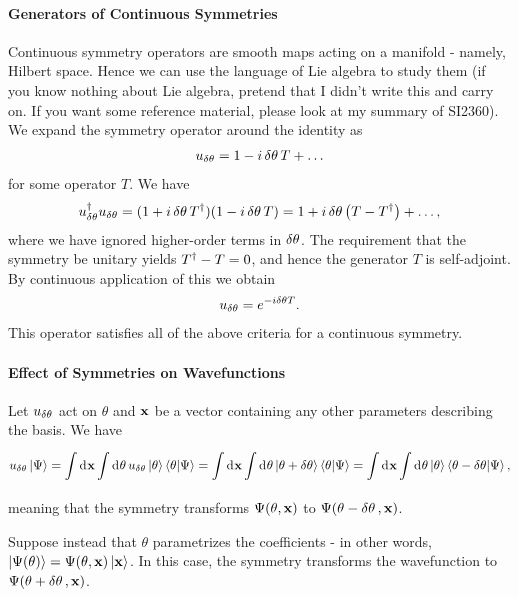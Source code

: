 \paragraph{Generators of Continuous Symmetries}
Continuous symmetry operators are smooth maps acting on a manifold - namely, Hilbert space. Hence we can use the language of Lie algebra to study them (if you know nothing about Lie algebra, pretend that I didn't write this and carry on. If you want some reference material, please look at my summary of SI2360). We expand the symmetry operator around the identity as
\begin{align*}
	u_{\var{\theta}} = 1 - i\var{\theta}T + \dots
\end{align*}
for some operator $T$. We have
\begin{align*}
	u_{\var{\theta}}^{\dagger}u_{\var{\theta}} = (1 + i\var{\theta}T^{\dagger})(1 - i\var{\theta}T) = 1 + i\var{\theta}\left(T - T^{\dagger}\right) + \dots,
\end{align*}
where we have ignored higher-order terms in $\var{\theta}$. The requirement that the symmetry be unitary yields $T^{\dagger} - T = 0$, and hence the generator $T$ is self-adjoint. By continuous application of this we obtain
\begin{align*}
	u_{\var{\theta}} = e^{-i\var{\theta}T}.
\end{align*}
This operator satisfies all of the above criteria for a continuous symmetry.

\paragraph{Effect of Symmetries on Wavefunctions}
Let $u_{\var{\theta}}$ act on $\theta$ and $\vb{x}$ be a vector containing any other parameters describing the basis. We have
\begin{align*}
	u_{\var{\theta}}\ket{\Psi} = \int\limits_{}^{}\dd[]{\vb{x}}\int\limits_{}^{}\dd[]{\theta}u_{\var{\theta}}\ket{\theta}\braket{\theta}{\Psi} = \int\limits_{}^{}\dd[]{\vb{x}}\int\limits_{}^{}\dd[]{\theta}\ket{\theta + \var{\theta}}\braket{\theta}{\Psi} = \int\limits_{}^{}\dd[]{\vb{x}}\int\limits_{}^{}\dd[]{\theta}\ket{\theta}\braket{\theta - \var{\theta}}{\Psi},
\end{align*}
meaning that the symmetry transforms $\Psi(\theta, \vb{x})$ to $\Psi(\theta - \var{\theta}, \vb{x})$.

Suppose instead that $\theta$ parametrizes the coefficients - in other words, $\ket{\Psi(\theta)} = \Psi(\theta, \vb{x})\ket{\vb{x}}$. In this case, the symmetry transforms the wavefunction to $\Psi(\theta + \var{\theta}, \vb{x})$.

